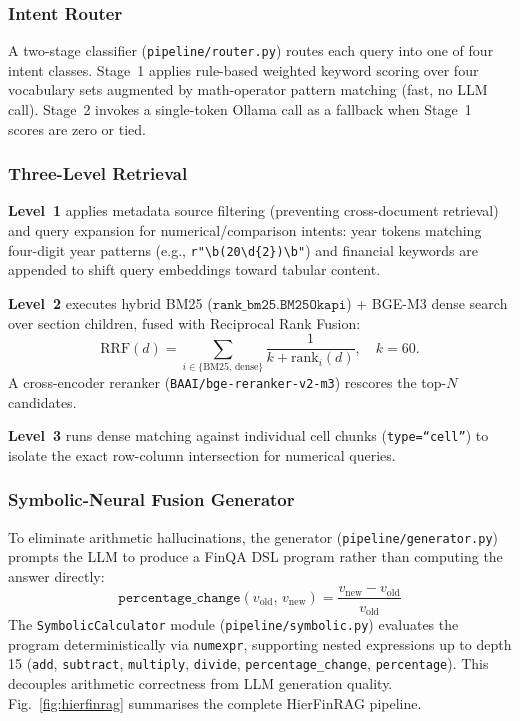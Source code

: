 \documentclass[conference]{IEEEtran}
\begin{document}
\subsubsection{Intent Router}
A two-stage classifier (\texttt{pipeline/router.py}) routes each query into
one of four intent classes. Stage~1 applies rule-based weighted keyword scoring
over four vocabulary sets augmented by math-operator pattern matching (fast,
no LLM call). Stage~2 invokes a single-token Ollama call as a fallback when
Stage~1 scores are zero or tied.

\subsubsection{Three-Level Retrieval}
\textbf{Level~1} applies metadata source filtering (preventing cross-document
retrieval) and query expansion for numerical/comparison intents: year tokens
matching four-digit year patterns (e.g., \texttt{r"\textbackslash b(20\textbackslash d\{2\})\textbackslash b"}) and financial
keywords are appended to shift query embeddings toward tabular content.

\textbf{Level~2} executes hybrid BM25 ($\texttt{rank\_bm25.BM25Okapi}$) +
BGE-M3 dense search over section children, fused with Reciprocal Rank Fusion:
\begin{equation}
\text{RRF}(d) = \sum_{i \in \{\text{BM25},\,\text{dense}\}} \frac{1}{k + \text{rank}_i(d)},
\quad k = 60.
\label{eq:rrf}
\end{equation}
A cross-encoder reranker (\texttt{BAAI/\allowbreak bge-\allowbreak reranker-\allowbreak v2-\allowbreak m3}) rescores the
top-$N$ candidates.

\textbf{Level~3} runs dense matching against individual cell chunks
(\texttt{type=``cell''}) to isolate the exact row-column intersection for
numerical queries.

\subsubsection{Symbolic-Neural Fusion Generator}
To eliminate arithmetic hallucinations, the generator
(\texttt{pipeline/generator.py}) prompts the LLM to produce a FinQA DSL
program rather than computing the answer directly:
\begin{equation}
\texttt{percentage\_change}(v_{\text{old}},\, v_{\text{new}}) = \frac{v_{\text{new}} - v_{\text{old}}}{v_{\text{old}}}
\end{equation}
\noindent The \texttt{Symbolic\allowbreak Calculator} module (\texttt{pipeline/\allowbreak symbolic.py}) evaluates
the program deterministically via \texttt{numexpr}, supporting nested
expressions up to depth 15 (\texttt{add}, \texttt{subtract}, \texttt{multiply},
\texttt{divide}, \texttt{percentage\_change}, \texttt{percentage}). This
decouples arithmetic correctness from LLM generation quality.
Fig.~\ref{fig:hierfinrag} summarises the complete HierFinRAG pipeline.
\end{document}
